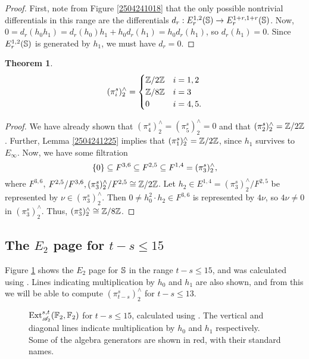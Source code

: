 \documentclass[11pt, titlepage]{article} %
\def\bb{\ensuremath\mathbb}
\def\subq{\ensuremath\subseteq}
\def\inte{\ensuremath\mathbb{Z}}
\def\A{\ensuremath{\mathscr{A}_2}}
\DeclareMathOperator{\Ext}{Ext}
\numberwithin{equation}{subsection}
\theoremstyle{plain}
\newtheorem{theorem}{Theorem}[subsection]
\theoremstyle{definition}
\begin{document}
\begin{proof}
First, note from Figure \ref{2504241018} that the only possible nontrivial differentials in this range are the differentials \(d_r : E_r^{1,2}(\bb{S}) \to E_r^{1+r, 1+r}(\bb{S})\). Now, \(0=d_r(h_0h_1)=d_r(h_0)h_1 + h_0d_r(h_1)=h_0d_r(h_1)\), so \(d_r(h_1)=0\). Since \(E_r^{1, 2}(\bb{S})\) is generated by \(h_1\), we must have \(d_r=0\). 
\end{proof}

\begin{theorem}
\begin{align*}
(\pi_i^s)^\wedge_2 = \begin{cases}
\inte/2\inte & i = 1, 2\\
\inte/8\inte & i = 3\\
0 & i = 4, 5.
\end{cases}
\end{align*}
\end{theorem}

\begin{proof}
We have already shown that \((\pi_4^s)_2^\wedge=(\pi_5^s)^\wedge_2=0\) and that \((\pi_2^s)^\wedge_2=\inte/2\inte\). Further, Lemma \ref{2504241225} implies that \((\pi_1^s)^\wedge_2=\inte/2\inte\), since \(h_1\) survives to \(E_\infty\). Now, we have some filtration
\[\{0\}\subq F^{3,6}\subq F^{2,5}\subq F^{1,4}= (\pi_3^s)^\wedge_2,\]
where \(F^{3,6}\), \(F^{2,5}/F^{3,6}, (\pi_3^s)^\wedge_2/F^{2,5}\cong \inte/2\inte\). Let \(h_2\in E^{1,4}=(\pi_3^s)^\wedge_2/F^{2,5}\) be represented by \(\nu\in (\pi_3^s)^\wedge_2\). Then \(0\neq h_0^2\cdot h_2\in F^{3,6}\) is represented by \(4\nu\), so \(4\nu \neq 0\) in \((\pi_3^s)^\wedge_2\). Thus, \((\pi_3^s)^\wedge_2\cong \inte/8\inte\).
\end{proof}

\subsection{The \(E_2\) page for \(t-s\leq 15\)}\label{2504291252}

Figure \ref{1304251243} shows the \(E_2\) page for \(\bb{S}\) in the range \(t-s\leq 15\), and was calculated using \autocite{sseq}. Lines indicating multiplication by \(h_0\) and \(h_1\) are also shown, and from this we will be able to compute \((\pi_{t-s}^s)^\wedge_2\) for \(t-s\leq 13\). 

\begin{figure}
\centering

\caption[\(\Ext_{\A}^{s,t}(\bb{F}_2, \bb{F}_2)\) for \(t-s\leq 18\).]{\(\Ext_{\A}^{s,t}(\bb{F}_2, \bb{F}_2)\) for \(t-s\leq 15\), calculated using \autocite{sseq}. The vertical and diagonal lines indicate multiplication by \(h_0\) and \(h_1\) respectively. Some of the algebra generators are shown in red, with their standard names.}
\label{1304251243}
\end{figure}
\end{document}
